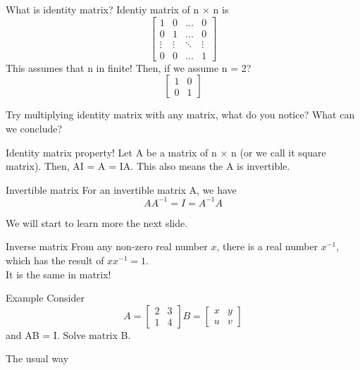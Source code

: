 \documentclass[
	11pt, %
]{beamer}
\begin{document}
\begin{frame}{What is identity matrix?}
    Identiy matrix of n $\times$ n is\\
    \[
    \begin{bmatrix}
        1 & 0 &\ldots & 0\\
        0 & 1 &\ldots & 0\\
        \vdots&\vdots & \ddots & \vdots\\
        0 & 0 & \ldots& 1
    \end{bmatrix}
    \]
    This assumes that n in finite! Then, if we assume n = 2?\\
    \[
    \begin{bmatrix}
        1 & 0\\
        0 & 1
    \end{bmatrix}
    \]
    \begin{block}{}
        Try multiplying identity matrix with any matrix, what do you notice? What can we conclude?
    \end{block}
\end{frame}

\begin{frame}{Identity matrix property!}
    Let A be a matrix of n $\times$ n (or we call it square matrix). Then, AI = A = IA. This also means the A is invertible.\\
    \bigskip
    \begin{block}{Invertible matrix}
        For an invertible matrix A, we have\\
        \[
            AA^{-1} = I = A^{-1}A
        \]
    \end{block}
    We will start to learn more the next slide.
\end{frame}

\begin{frame}{Inverse matrix}
    From any non-zero real number $x$, there is a real number $x^{-1}$, which has the result of $xx^{-1} = 1.$\\
    It is the same in matrix!
    \begin{block}{Example}
        Consider 
        \[
            A =
            \begin{bmatrix}
                2 & 3\\
                1 & 4
            \end{bmatrix}
            B = 
            \begin{bmatrix}
                x & y\\
                u & v
            \end{bmatrix}
        \]
        and AB = I. Solve matrix B.
    \end{block}
\end{frame}
\begin{frame}{The usual way}
\end{frame}
\end{document}
